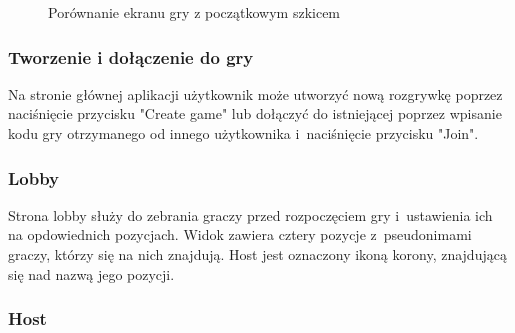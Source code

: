 \begin{figure}[h!]
    \centering
    \hspace*{0.5cm}
    \caption{Porównanie ekranu gry z początkowym szkicem}
    \label{fig:compare_game}
  \end{figure}
  
\FloatBarrier
 
\subsubsection{Tworzenie i dołączenie do gry}

Na stronie głównej aplikacji użytkownik może utworzyć nową rozgrywkę 
poprzez naciśnięcie przycisku "Create game" lub dołączyć do istniejącej poprzez 
wpisanie kodu gry otrzymanego od innego użytkownika i~naciśnięcie przycisku "Join".

\subsubsection{Lobby}

Strona lobby służy do zebrania graczy przed rozpoczęciem gry i~ustawienia ich 
na opdowiednich pozycjach. Widok zawiera cztery pozycje z~pseudonimami graczy,
którzy się na nich znajdują. Host jest oznaczony ikoną korony, znajdującą się nad nazwą 
jego pozycji.

\subsubsection{Host}

